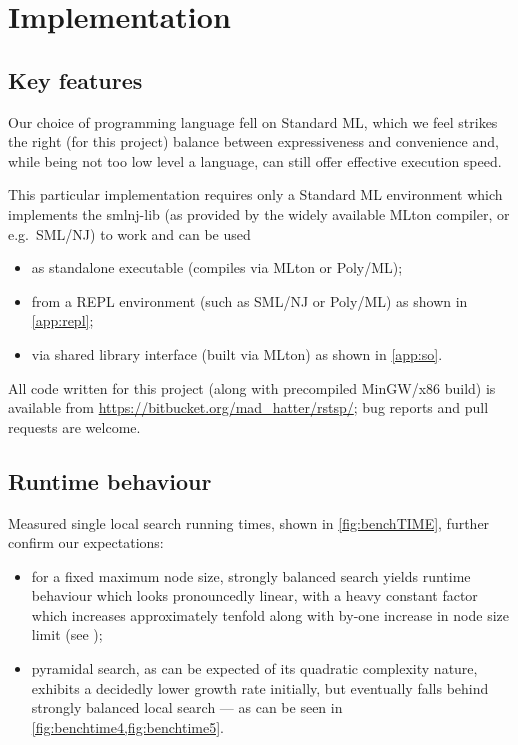 \documentclass[index=totoc,bibliography=totoc]{scrartcl}
\numberwithin{equation}{section}
\numberwithin{figure}{section}
\numberwithin{table}{section}
\begin{document}

\section{Implementation}
\vspace{0.87em}

\subsection{Key features}

Our choice of programming language fell on Standard ML, which we feel
strikes the right (for this project) balance between expressiveness and
convenience and, while being not too low level a language, can still offer
effective execution speed.

This particular implementation requires only a Standard ML environment
which implements the {\ttfamily smlnj-lib}
(as provided by the widely available {\ttfamily MLton} compiler, or e.g.\ {\ttfamily SML/NJ})
to work and can be used
\begin{itemize}
  \item as standalone executable
    (compiles via {\ttfamily MLton} or {\ttfamily Poly/ML});
  \item from a REPL environment
    (such as {\ttfamily SML/NJ} or {\ttfamily Poly/ML})
    as shown in \autoref{app:repl};
  \item via shared library interface
    (built via {\ttfamily MLton}) as shown in \autoref{app:so}.
\end{itemize}

All code written for this project
(along with precompiled {\ttfamily MinGW/x86} build)
is available from \url{https://bitbucket.org/mad_hatter/rstsp/};
bug reports and pull requests are welcome.

\subsection{Runtime behaviour}

Measured single local search running times, shown in \cref{fig:benchTIME},
further confirm our expectations:

\begin{itemize}
  \item
    for a fixed maximum node size, strongly balanced search yields runtime
    behaviour which looks pronouncedly linear, with a heavy constant
    factor which increases approximately tenfold along with
    by-one increase in node size limit
    (see );
  \item
    pyramidal search, as can be expected of its quadratic complexity
    nature, exhibits a decidedly lower growth rate initially, but eventually
    falls behind strongly balanced local search --- as can be seen
    in \cref{fig:benchtime4,fig:benchtime5}.
\end{itemize}
\end{document}
